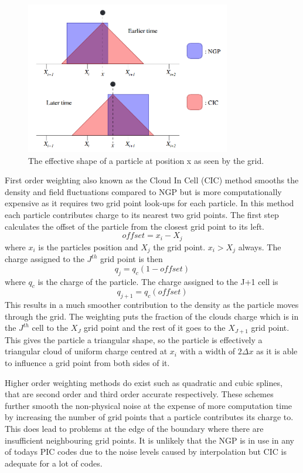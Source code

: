 \documentclass[12pt]{article}
\def\be{\begin{equation}}
\def\ee{\end{equation}}
\begin{document}
\begin{figure}[H]
\centering
\includegraphics[width=0.8\textwidth]{particleshape}
\caption{The effective shape of a particle at position x as seen by the grid.\cite{shape}}
\label{fig:shape}
\end{figure}
First order weighting also known as the Cloud In Cell (CIC) method smooths the density and field fluctuations compared to NGP but is more computationally expensive as it requires two grid point look-ups for each particle. In this method each particle contributes charge to its nearest two grid points. The first step calculates the offset of the particle from the closest grid point to its left. 
\be
offset = x_i - X_j 
\ee 
where $x_i$ is the particles position and $X_j$ the grid point. $x_i > X_j$ always. The charge assigned to the $J^{th}$ grid point is then 
\be 
q_j = q_c \left(1 - offset\right)
\ee 
where $q_c$ is the charge of the particle. 
The charge assigned to the J+1 cell is 
\be 
q_{j+1} = q_c \left(offset\right)
\ee 
This results in a much smoother contribution to the density as the particle moves through the grid. The weighting puts the fraction of the clouds charge which is in the $J^{th}$ cell to the $X_J$ grid point and the rest of it goes to the $X_{J+1}$ grid point. This  gives the particle a triangular shape, so the particle is effectively a triangular cloud of uniform charge centred at $x_i$ with a width of $2\Delta x$ as it is able to influence a grid point from both sides of it. 

Higher order weighting methods do exist such as quadratic and cubic splines, that are second order and third order accurate respectively. These schemes further smooth the non-physical noise at the expense of more computation time by increasing the number of grid points that a particle contributes its charge to. This does lead to problems at the edge of the boundary where there are insufficient neighbouring grid points. It is unlikely that the NGP is in use in any of todays PIC codes due to the noise levels caused by interpolation but CIC is adequate for a lot of codes.
\end{document}
